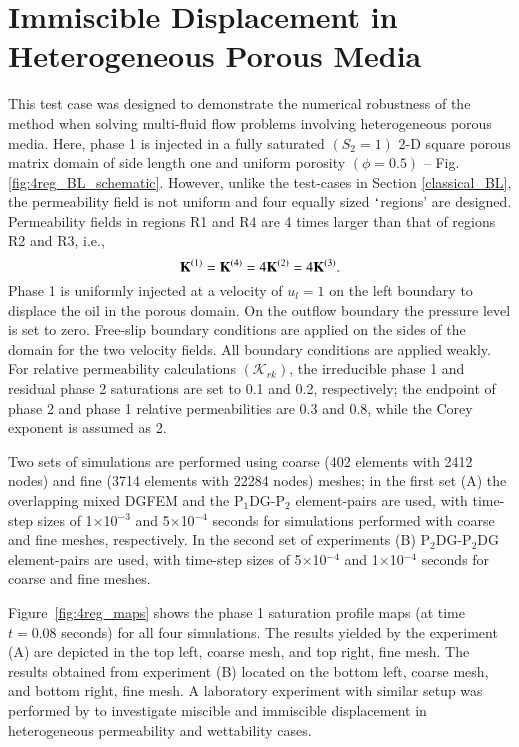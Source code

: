 \documentclass[preprint,authoryear,12pt]{elsarticle}
\newcommand{\PN}[2][error]{P$_{#1}$DG-P$_{#2}$}
\begin{document}
\section{Immiscible Displacement in Heterogeneous Porous Media}\label{res2}
This test case was designed to demonstrate the numerical robustness of
the method when solving multi-fluid flow problems involving
heterogeneous porous media.  Here, phase 1 is injected in a fully
saturated $\left(S_{2}=1\right)$ 2-D square porous matrix domain of
side length one and uniform porosity $\left(\phi=0.5\right)$ --
Fig. \ref{fig:4reg_BL_schematic}. However, unlike the test-cases in
Section \ref{classical_BL}, the permeability field is not uniform and
four equally sized $\lq$regions' are designed.  Permeability fields in
regions R1 and R4 are 4 times larger than that of regions R2 and R3,
i.e.,
\begin{displaymath}
  \mathbf{K}^{\text(1)}=\mathbf{K}^{\text(4)} =
  4\mathbf{K}^{\text(2)}=4\mathbf{K}^{\text{(3)}}.
\end{displaymath}
Phase 1 is uniformly injected at a velocity of $u_{l}=1$ on the left
boundary to displace the oil in the porous domain. On the outflow
boundary the pressure level is set to zero. Free-slip boundary
conditions are applied on the sides of the domain for the two velocity
fields. All boundary conditions are applied weakly. For relative
permeability calculations $\left(\mathcal{K}_{rk}\right)$, the
irreducible phase 1 and residual phase 2 saturations are set to 0.1
and 0.2, respectively; the endpoint of phase 2 and phase 1 relative
permeabilities are 0.3 and 0.8, while the Corey exponent is assumed as
2.

Two sets of simulations are performed using coarse (402 elements with
2412 nodes) and fine (3714 elements with 22284 nodes) meshes; in the
first set (A) the overlapping mixed DGFEM and the \PN[1]{2}
element-pairs are used, with time-step sizes of 1$\times$10$^{-3}$ and
5$\times$10$^{-4}$ seconds for simulations performed with coarse and
fine meshes, respectively. In the second set of experiments (B)
\PN[2]{2}DG element-pairs are used, with time-step sizes of
5$\times$10$^{-4}$ and 1$\times$10$^{-4}$ seconds for coarse and fine
meshes.

Figure~\ref{fig:4reg_maps} shows the phase 1 saturation profile maps
(at time $t=0.08$ seconds) for all four simulations. The results
yielded by the experiment (A) are depicted in the top left, coarse
mesh, and top right, fine mesh. The results obtained from experiment
(B) located on the bottom left, coarse mesh, and bottom right, fine
mesh. A laboratory experiment with similar setup was performed by
\citet{dawe_2008} to investigate miscible and immiscible displacement
in heterogeneous permeability and wettability cases.
\end{document}
